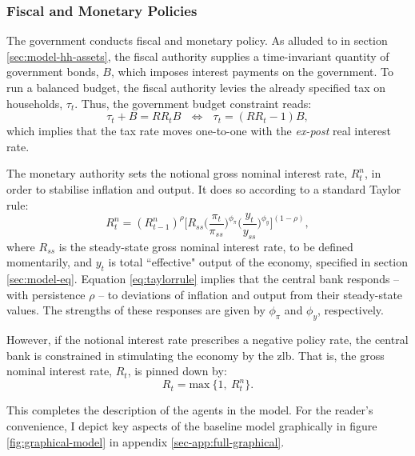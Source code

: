 \documentclass[a4paper,12pt]{article} %
\numberwithin{equation}{section} %
\numberwithin{figure}{section}
\numberwithin{table}{section}
\begin{document}
\subsubsection{Fiscal and Monetary Policies}
\label{sec:model-policy}

The government conducts fiscal and monetary policy. As alluded to in section \ref{sec:model-hh-assets}, the fiscal authority supplies a time-invariant quantity of government bonds, $B$, which imposes interest payments on the government. To run a balanced budget, the fiscal authority levies the already specified tax on households, $\tau_t$. Thus, the government budget constraint reads:
\begin{equation}
    \tau_t + B = RR_t B \ \ \ \Leftrightarrow \ \ \ \tau_t = (RR_t - 1)B, \label{eq:fiscal-budget}
\end{equation}
which implies that the tax rate moves one-to-one with the \textit{ex-post} real interest rate.

The monetary authority sets the notional gross nominal interest rate, $R_{t}^n$, in order to stabilise inflation and output. It does so according to a standard Taylor rule:
\begin{equation}
    R_{t}^n = ( R_{t-1}^n )^{\rho} \Bigg[ R_{ss} \Bigg( \frac{\pi_t}{\pi_{ss}} \Bigg)^{\phi_{\pi}} \Bigg( \frac{y_t}{y_{ss}} \Bigg)^{\phi_y} \Bigg]^{(1-\rho)}, \label{eq:taylorrule}
\end{equation}
where $R_{ss}$ is the steady-state gross nominal interest rate, to be defined momentarily, and $y_t$ is total ``effective" output of the economy, specified in section \ref{sec:model-eq}. Equation \eqref{eq:taylorrule} implies that the central bank responds -- with persistence $\rho$ -- to deviations of inflation and output from their steady-state values. The strengths of these responses are given by $\phi_{\pi}$ and $\phi_y$, respectively. 

However, if the notional interest rate prescribes a negative policy rate, the central bank is constrained in stimulating the economy by the \Gls{zlb}. That is, the gross nominal interest rate, $R_t$, is pinned down by: 
\begin{equation}
    R_t = \text{max} \ \{ 1, \ R_{t}^n \}. \label{eq:zlb}
\end{equation}

This completes the description of the agents in the model. For the reader's convenience, I depict key aspects of the baseline model graphically in figure \ref{fig:graphical-model} in appendix \ref{sec-app:full-graphical}.
\end{document}
